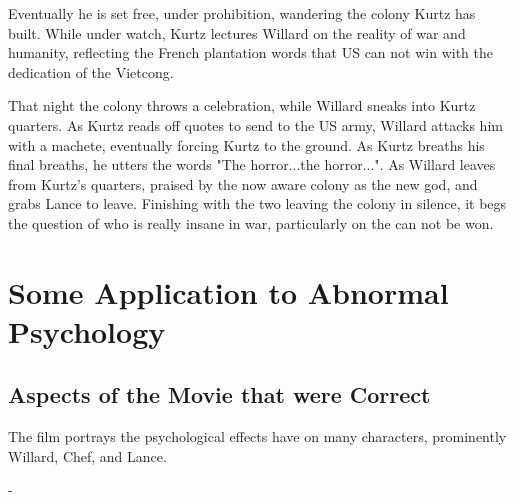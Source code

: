 \documentclass[a4paper,man,natbib]{apa6}
\begin{document}
Eventually he is set free, under prohibition, wandering the colony Kurtz has built. While under watch, Kurtz lectures Willard on the reality of war and humanity, reflecting the French plantation words that US can not win with the dedication of the Vietcong.

That night the colony throws a celebration, while Willard sneaks into Kurtz quarters. As Kurtz reads off quotes to send to the US army, Willard attacks him with a machete, eventually forcing Kurtz to the ground. As Kurtz breaths his final breaths, he utters the words "The horror...the horror...". As Willard leaves from Kurtz's quarters, praised by the now aware colony as the new god, and grabs Lance to leave. Finishing with the two leaving the colony  in silence, it begs the question of who is really insane in war, particularly on the can not be won.

\section{Some Application to Abnormal Psychology}
\label{sec:examples}

\subsection{Aspects of the Movie that were Correct}

The film portrays the psychological effects have on many characters, prominently Willard, Chef, and Lance.

-
\end{document}
